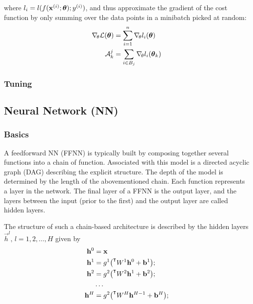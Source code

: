         where $l_i = l(f(\mathbf{x}^{(i)};\boldsymbol{\theta}); y^{(i)})$, and thus approximate the gradient of the cost function by only summing over the data points in a minibatch picked at random:
        \begin{align}
            \nabla_{\!\theta} \mathcal{L}(\boldsymbol{\theta}) &= \sum_{i=1}^n \nabla_{\!\theta}l_i(\boldsymbol{\theta}) \\
            \mathcal{A}^j_k &= \sum_{i\in B_j}\nabla_{\!\theta} l_i(\boldsymbol{\theta}_k)
        \end{align}

        
    
    \subsubsection{Tuning}\label{sec:tuning}

\subsection{Neural Network (NN)}\label{sec:neural_network}

    \subsubsection{Basics}\label{sec:basics}

    A feedforward NN (FFNN) is typically built by composing together several functions into a chain of function. Associated with this model is a directed acyclic graph (DAG) describing the explicit structure. The depth of the model is determined by the length of the abovementioned chain. Each function represents a layer in the network. The final layer of a FFNN is the output layer, and the layers between the input (prior to the first) and the output layer are called hidden layers. \citep{Goodfellow2016}

    The structure of such a chain-based architecture is described by the hidden layers $\vec{h}^l,\,l=1,2, \dots, H$ given by
    \begin{subequations}
        \begin{align} 
            \vec{h}^0 &= \vec{x} \\%
            \vec{h}^1 &= g^1 \big(\TT{W}^1 \vec{h}^0 + \vec{b}^1\big); \\
            \vec{h}^2 &= g^2 \big(\TT{W}^2 \vec{h}^1 + \vec{b}^2\big); \\
            &\dots \nonumber \\
            \vec{h}^{H} &= g^2 \big(\TT{W}^{H} \vec{h}^{H-1} + \vec{b}^H\big);             
        \end{align}
    \end{subequations}
    


